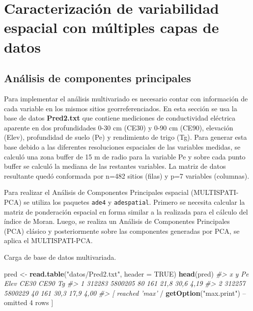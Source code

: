 \documentclass[11pt,b5paper,]{krantz}
\newenvironment{Shaded}{}{}
\newcommand{\KeywordTok}[1]{\textcolor[rgb]{0.00,0.44,0.13}{\textbf{#1}}}
\newcommand{\DataTypeTok}[1]{\textcolor[rgb]{0.56,0.13,0.00}{#1}}
\newcommand{\DecValTok}[1]{\textcolor[rgb]{0.25,0.63,0.44}{#1}}
\newcommand{\StringTok}[1]{\textcolor[rgb]{0.25,0.44,0.63}{#1}}
\newcommand{\CommentTok}[1]{\textcolor[rgb]{0.38,0.63,0.69}{\textit{#1}}}
\newcommand{\OtherTok}[1]{\textcolor[rgb]{0.00,0.44,0.13}{#1}}
\newcommand{\OperatorTok}[1]{\textcolor[rgb]{0.40,0.40,0.40}{#1}}
\newcommand{\NormalTok}[1]{#1}
\begin{document}
\section{Caracterización de variabilidad espacial con múltiples capas de
datos}\label{caracterizaciuxf3n-de-variabilidad-espacial-con-muxfaltiples-capas-de-datos-1}

\subsection{Análisis de componentes
principales}\label{anuxe1lisis-de-componentes-principales-1}

Para implementar el análisis multivariado es necesario contar con
información de cada variable en los mismos sitios georreferenciados. En
esta sección se usa la base de datos \textbf{Pred2.txt} que contiene
mediciones de conductividad eléctrica aparente en dos profundidades 0-30
cm (CE30) y 0-90 cm (CE90), elevación (Elev), profundidad de suelo (Pe)
y rendimiento de trigo (Tg). Para generar esta base debido a las
diferentes resoluciones espaciales de las variables medidas, se calculó
una zona buffer de 15 m de radio para la variable Pe y sobre cada punto
buffer se calculó la mediana de las restantes variables. La matriz de
datos resultante quedó conformada por n=482 sitios (filas) y p=7
variables (columnas).

Para realizar el Análisis de Componentes Principales espacial
(MULTISPATI-PCA) se utiliza los paquetes \texttt{ade4} y
\texttt{adespatial}. Primero se necesita calcular la matriz de
ponderación espacial en forma similar a la realizada para el cálculo del
índice de Moran. Luego, se realiza un Análisis de Componentes
Principales (PCA) clásico y posteriormente sobre las componentes
generadas por PCA, se aplica el MULTISPATI-PCA.

Carga de base de datos multivariada.

\begin{Shaded}
\begin{Highlighting}[]
\NormalTok{pred <-}\StringTok{ }\KeywordTok{read.table}\NormalTok{(}\StringTok{"datos/Pred2.txt"}\NormalTok{, }
                   \DataTypeTok{header =} \OtherTok{TRUE}\NormalTok{)}
\KeywordTok{head}\NormalTok{(pred)}
\CommentTok{#> x y Pe Elev CE30 CE90 Tg}
\CommentTok{#> 1 312283 5800205 80 161 21,8 30,6 4,19}
\CommentTok{#> 2 312257 5800229 40 161 30,3 17,9 4,00}
\CommentTok{#> [ reached 'max'}
    \OperatorTok{/}\StringTok{ }\KeywordTok{getOption}\NormalTok{(}\StringTok{"max.print"}\NormalTok{) }\OperatorTok{--}
\NormalTok{omitted }\DecValTok{4}\NormalTok{ rows ]}
\end{Highlighting}
\end{Shaded}
\end{document}
